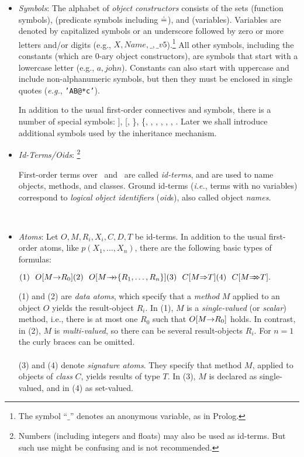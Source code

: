 \documentclass[11pt]{report}
\begin{document}
\begin{itemize}
\item \emph{Symbols}: The \fl alphabet of \emph{object constructors}
  consists of the sets \funcs (function symbols), \preds (predicate symbols
  including $\doteq$), and \vars (variables).  Variables are denoted by
  capitalized symbols or an underscore followed by zero or more letters
  and/or digits (e.g., $X,\textit{Name}, \_, \_v5$).\footnote{
    The symbol ``$\_$'' denotes an anonymous variable, as in Prolog.
    }
  All other symbols, including the constants (which are 0-ary object
  constructors), are symbols that start with a lowercase letter (e.g., $a,
  \textit{john}$). Constants can also start with uppercase and include
  non-alphanumeric symbols, but then they must be enclosed in single
  quotes ({\it e.g.}, {\tt 'AB@*c'}). 
  
  In addition to the usual first-order connectives and symbols,
  there is a number of special symbols: ], [, \}, \{, \fd, \mvd, \Fd,
  \Mvd,
  \isa, \subcl. Later we shall introduce additional symbols used by the
  inheritance mechanism.
\item \emph{Id-Terms/Oids}:%
\footnote{
    Numbers (including integers and floats) may also be used as id-terms. But
    such use might be confusing and is not recommended.
    }
\medskip
  
  \begin{minipage}[t]{.80\textwidth}
    First-order terms over \funcs\ and \vars\ are called \emph{id-terms},
    and are used to name objects, methods, and classes.  Ground id-terms
    ({\it i.e.}, terms with no variables) correspond to \emph{logical
      object identifiers} (\emph{oid}s), also called object \emph{names}.
  \end{minipage}
  \hfill ~
\item \emph{Atoms}: Let $O,M,R_{i},X_{i},C,D,T$ be id-terms.  In
  addition to the usual first-order atoms, like $p(X_1,\dots,X_n)$, there
  are the following basic types of formulas: \medskip

  \begin{math}
    \hfill (1)~~O[M\fd R_0] \hfill (2)~~O[M\mvd \{R_1,\dots,R_n\}]
    \hfill (3)~~C[M\Fd T] \hfill (4)~~C[M\Mvd T]. \hfill
  \end{math} \medskip
  
  (1) and (2) are \emph{data atoms}, which specify that a \emph{method} $M$
  applied to an object $O$ yields the result-object $R_i$. In (1), $M$ is a
  \emph{single-valued} (or \emph{scalar}) method, i.e., there is
  at most one $R_0$ such that $O[M{\rightarrow} R_0]$ holds. In contrast, in
  (2), $M$ is \emph{multi-valued}, so there can be several result-objects
  $R_i$. For $n=1$ the curly braces can be omitted.\\ 
  \\
  (3) and (4) denote \emph{signature atoms}. They specify that method $M$,
  applied to objects of \emph{class} $C$, yields results of type $T$.
  In (3), $M$ is declared as single-valued, and in (4) as set-valued.
  

\end{itemize}
\end{document}
